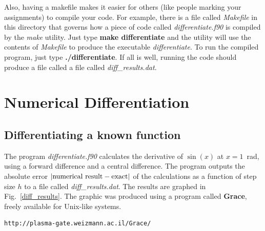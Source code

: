 \documentclass{article}
\begin{document}
Also, having a makefile makes it easier for others (like people marking your assignments) to 
compile your code.  For example, there
is a file called {\it Makefile} in this directory that governs how a  piece of code called 
{\it differentiate.f90} is compiled by the {\it make} utility.  Just type {\bf make differentiate} and the utility will use the contents of {\it Makefile}
to produce the executable {\it differentiate}.  To run the compiled program, just type {\bf ./differentiate}.  If all is well, running the code should produce a file called a file called {\it diff\_results.dat}.

\section{Numerical Differentiation}

\subsection{Differentiating a known function}

The program {\it differentiate.f90} calculates the derivative of 
$\sin(x)$ at $x=1$~rad, using a forward difference and
a central difference.  The program outputs the
absolute error $\left| {\rm numerical \,\, result} - {\rm exact} \right|$ of the calculations as a function of 
step size $h$ to a file called {\it diff\_results.dat}.  The results are graphed in Fig.~\ref{diff_results}.  The graphic 
was produced using a program called {\bf Grace}, freely available for Unix-like systems.
\begin{verbatim}
http://plasma-gate.weizmann.ac.il/Grace/
\end{verbatim}
\end{document}
